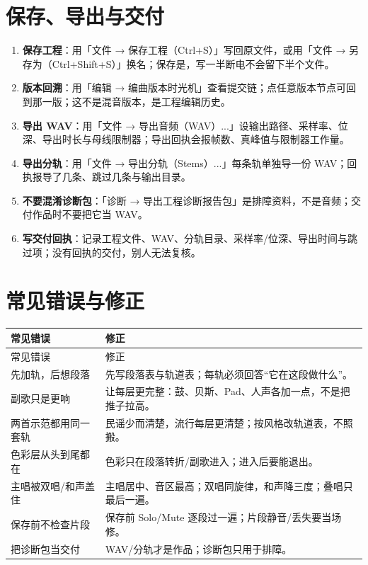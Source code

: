 \section{保存、导出与交付}
\label{sec:walkthrough-delivery}

\begin{enumerate}
\item \textbf{保存工程}：用「文件 → 保存工程（Ctrl+S）」写回原文件，或用「文件 → 另存为（Ctrl+Shift+S）」换名；保存是，写一半断电不会留下半个文件。
\item \textbf{版本回溯}：用「编辑 → 编曲版本时光机」查看提交链；点任意版本节点可回到那一版；这不是混音版本，是工程编辑历史。
\item \textbf{导出 WAV}：用「文件 → 导出音频（WAV）...」设输出路径、采样率、位深、导出时长与母线限制器；导出回执会报帧数、真峰值与限制器工作量。
\item \textbf{导出分轨}：用「文件 → 导出分轨（Stems）...」每条轨单独导一份 WAV；回执报导了几条、跳过几条与输出目录。
\item \textbf{不要混淆诊断包}：「诊断 → 导出工程诊断报告包」是排障资料，不是音频；交付作品时不要把它当 WAV。
\item \textbf{写交付回执}：记录工程文件、WAV、分轨目录、采样率/位深、导出时间与跳过项；没有回执的交付，别人无法复核。
\end{enumerate}



\section{常见错误与修正}
\label{sec:walkthrough-mistakes}

\begin{longtable}{p{}p{}}
\toprule
常见错误 & 修正 \\
\midrule
\endfirsthead
\toprule
常见错误 & 修正 \\
\midrule
\endhead
先加轨，后想段落 & 先写段落表与轨道表；每轨必须回答“它在这段做什么”。 \\
副歌只是更响 & 让每层更完整：鼓、贝斯、Pad、人声各加一点，不是把推子拉高。 \\
两首示范都用同一套轨 & 民谣少而清楚，流行每层更清楚；按风格改轨道表，不照搬。 \\
色彩层从头到尾都在 & 色彩只在段落转折/副歌进入；进入后要能退出。 \\
主唱被双唱/和声盖住 & 主唱居中、音区最高；双唱同旋律，和声降三度；叠唱只最后一遍。 \\
保存前不检查片段 & 保存前 Solo/Mute 逐段过一遍；片段静音/丢失要当场修。 \\
把诊断包当交付 & WAV/分轨才是作品；诊断包只用于排障。 \\
\bottomrule
\end{longtable}

